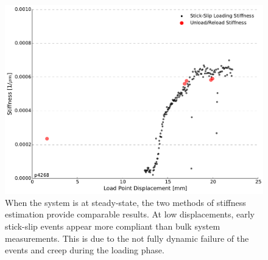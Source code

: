 \documentclass[11pt]{article}
\begin{document}
\begin{figure}
    \centering
        \includegraphics[scale=0.4]{../Figures/Fig_Stiffness_Methods/Stiffness_Methods.pdf}
       \caption{When the system is at steady-state, the two methods of stiffness
       estimation provide comparable results. At low displacements, early stick-slip
       events appear more compliant than bulk system measurements. This is due to the
       not fully dynamic failure of the events and creep during the loading phase.}
      \label{Figure:Stiffness Methods}
\end{figure}
\end{document}
